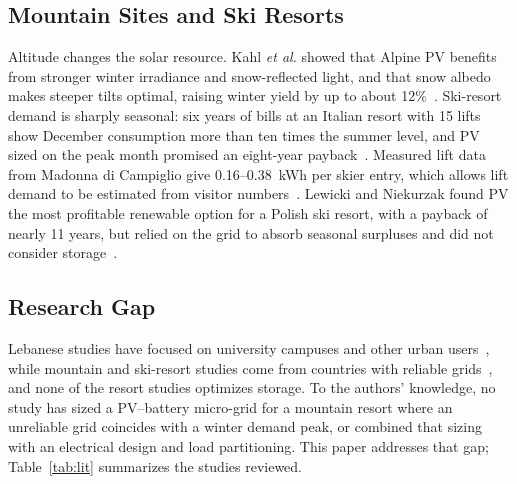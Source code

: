 \subsection{Mountain Sites and Ski Resorts}
Altitude changes the solar resource. Kahl \textit{et al.} showed that Alpine PV benefits from stronger winter irradiance and snow-reflected light, and that snow albedo makes steeper tilts optimal, raising winter yield by up to about 12\%~\cite{kahl2019}. Ski-resort demand is sharply seasonal: six years of bills at an Italian resort with 15 lifts show December consumption more than ten times the summer level, and PV sized on the peak month promised an eight-year payback~\cite{scuderi2025}. Measured lift data from Madonna di Campiglio give 0.16--0.38~kWh per skier entry, which allows lift demand to be estimated from visitor numbers~\cite{viesi2023}. Lewicki and Niekurzak found PV the most profitable renewable option for a Polish ski resort, with a payback of nearly 11 years, but relied on the grid to absorb seasonal surpluses and did not consider storage~\cite{lewicki2024}.

\subsection{Research Gap}
Lebanese studies have focused on university campuses and other urban users~\cite{chedid2015,chedid2020,tarnini2023}, while mountain and ski-resort studies come from countries with reliable grids~\cite{kahl2019,lewicki2024,scuderi2025}, and none of the resort studies optimizes storage. To the authors' knowledge, no study has sized a PV--battery micro-grid for a mountain resort where an unreliable grid coincides with a winter demand peak, or combined that sizing with an electrical design and load partitioning. This paper addresses that gap; Table~\ref{tab:lit} summarizes the studies reviewed.

